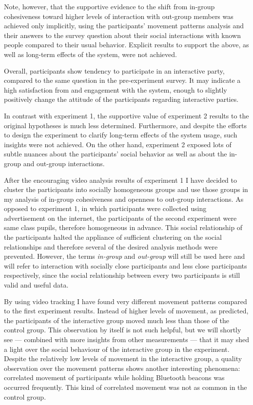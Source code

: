 \documentclass[a4paper,11pt]{article}
\newcommand{\definition}[1]{\emph{#1}}
\begin{document}
{Note, however, that the supportive evidence to the shift from in-group cohesiveness toward higher levels of interaction with out-group members was achieved only implicitly, using the participants' movement patterns analysis and their answers to the survey question about their social interactions with known people compared to their usual behavior.
Explicit results to support the above, as well as long-term effects of the system, were not achieved.

Overall, participants show tendency to participate in an interactive party, compared to the same question in the pre-experiment survey.
It may indicate a high satisfaction from and engagement with the system, enough to slightly positively change the attitude of the participants regarding interactive parties.

In contrast with experiment 1, the supportive value of experiment 2 results to the original hypotheses is much less determined.
Furthermore, and despite the efforts to design the experiment to clarify long-term effects of the system usage, such insights were not achieved.
On the other hand, experiment 2 exposed lots of subtle nuances about the participants' social behavior as well as about the in-group and out-group interactions.

After the encouraging video analysis results of experiment 1 I have decided to cluster the participants into socially homogeneous groups and use those groups in my analysis of in-group cohesiveness and openness to out-group interactions.
As opposed to experiment 1, in which participants were collected using advertisement on the internet, the participants of the second experiment were same class pupils, therefore homogeneous in advance.
This social relationship of the participants halted the appliance of sufficient clustering on the social relationships and therefore several of the desired analysis methods were prevented.
However, the terms \definition{in-group} and \definition{out-group} will still be used here and will refer to interaction with socially close participants and less close participants respectively, since the social relationship between every two participants is still valid and useful data.

By using video tracking I have found very different movement patterns compared to the first experiment results.
Instead of higher levels of movement, as predicted, the participants of the interactive group moved much less than those of the control group.
This observation by itself is not such helpful, but we will shortly see --- combined with more insights from other measurements --- that it may shed a light over the social behaviour of the interactive group in the experiment.
Despite the relatively low levels of movement in the interactive group, a quality observation over the movement patterns shows another interesting phenomena: correlated movement of participants while holding Bluetooth beacons was occurred frequently.
This kind of correlated movement was not as common in the control group.

}
\end{document}
